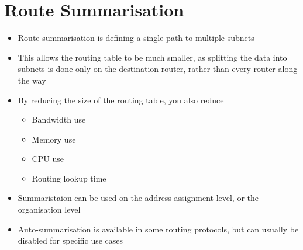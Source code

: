 \section*{Route Summarisation}

\begin{itemize}
  \item Route summarisation is defining a single path to multiple subnets
  \item This allows the routing table to be much smaller, as splitting the data into subnets is done only on the destination router, rather than every router along the way
  \item By reducing the size of the routing table, you also reduce
  \begin{itemize}
    \item Bandwidth use
    \item Memory use
    \item CPU use
    \item Routing lookup time
  \end{itemize}
  \item Summaristaion can be used on the address assignment level, or the organisation level
  \item Auto-summarisation is available in some routing protocols, but can usually be disabled for specific use cases
\end{itemize}